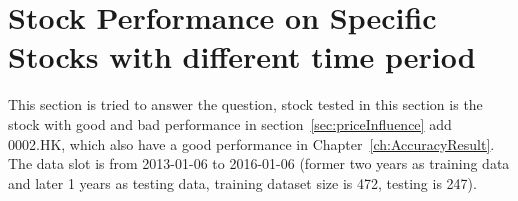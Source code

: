 \section{Stock Performance on Specific Stocks with different time period}
This section is tried to answer the question, stock tested in this section is the stock with good and bad performance in section~\ref{sec:priceInfluence} add 0002.HK, which also have a good performance in Chapter~\ref{ch:AccuracyResult}.\\


The data slot is from 2013-01-06 to 2016-01-06 (former two years as training data and later 1 years as testing data, training dataset size is 472, testing is 247).